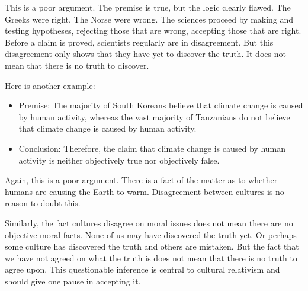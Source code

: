 \documentclass[]{article}
\begin{document}
This is a poor argument. The premise is true, but the logic clearly
flawed. The Greeks were right. The Norse were wrong. The sciences
proceed by making and testing hypotheses, rejecting those that are
wrong, accepting those that are right. Before a claim is proved,
scientists regularly are in disagreement. But this disagreement only
shows that they have yet to discover the truth. It does not mean that
there is no truth to discover.

Here is another example:

\begin{itemize}
\itemsep1pt\parskip0pt
\item
  Premise: The majority of South Koreans believe that climate change is
  caused by human activity, whereas the vast majority of Tanzanians do
  not believe that climate change is caused by human activity.
\item
  Conclusion: Therefore, the claim that climate change is caused by
  human activity is neither objectively true nor objectively false.
\end{itemize}

Again, this is a poor argument. There is a fact of the matter as to
whether humans are causing the Earth to warm. Disagreement between
cultures is no reason to doubt this.

Similarly, the fact cultures disagree on moral issues does not mean
there are no objective moral facts. None of us may have discovered the
truth yet. Or perhaps some culture has discovered the truth and others
are mistaken. But the fact that we have not agreed on what the truth is
does not mean that there is no truth to agree upon. This questionable
inference is central to cultural relativism and should give one pause in
accepting it.
\end{document}
